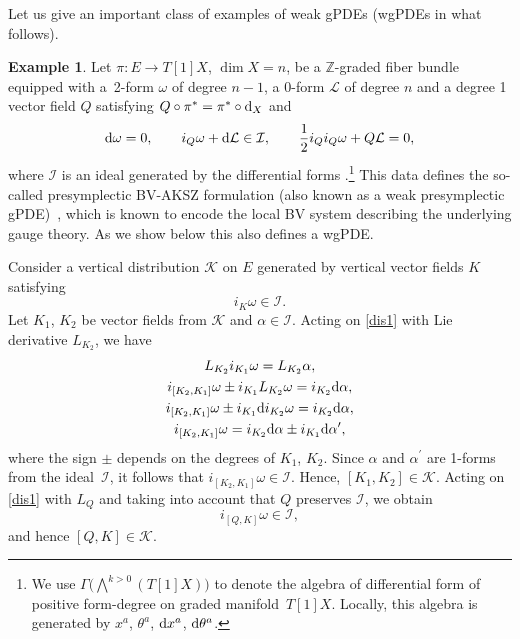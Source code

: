 \documentclass[pdftex]{sigma}
\numberwithin{equation}{section}
\theoremstyle{definition}
\newtheorem{Example}[Theorem]{Example}
\newcommand{\changed}[1]{{#1}}
\begin{document}
Let us give an important class of examples of weak gPDEs (wgPDEs in what follows).

\begin{Example} \label{ex:presymp}
 Let $\pi\colon E\rightarrow T[1]X$, $\dim{X}=n$, be a $\mathbb{Z}$-graded fiber bundle equipped with a~2-form $\omega$ of degree $n-1$, a 0-form $\mathcal{L}$ of degree $n$ and a degree 1 vector field $Q$ satisfying $Q\circ\pi^*=\pi^*\circ {\rm d}_X$ and
 \begin{equation*}%
 {\rm d}\omega=0,\qquad i_Q\omega+{\rm d}\mathcal{L}\in \mathcal{I},\qquad \frac{1}{2}i_Qi_Q\omega+Q\mathcal{L}=0,
 \end{equation*}
 where $\mathcal{I}$ is an ideal generated by the differential forms .\footnote{\changed{We use $\Gamma\bigl(\bigwedge^{k>0}(T[1]X)\bigr)$ to denote the algebra of differential form of positive form-degree on graded manifold~$T[1]X$. Locally, this algebra is generated by $x^a$, $\theta^a$, ${\rm d}x^a$, ${\rm d}\theta^a$.}} This data defines the so-called presymplectic BV-AKSZ formulation (also known as a weak presymplectic gPDE)~\cite{Dneprov:2024cvt, Grigoriev:2022zlq}, which is known to encode the local BV system describing the underlying gauge theory. As we show below this also defines a wgPDE.

 Consider a vertical distribution $\mathcal{K}$ on $E$ generated by vertical vector fields $K$ satisfying
 \begin{equation}\label{dis1}
 i_K\omega\in\mathcal{I}.
 \end{equation}
 Let $K_1$, $K_2$ be vector fields from $\mathcal{K}$ and $\alpha\in\mathcal{I}$. Acting on \eqref{dis1} with Lie derivative $L_{K_2}$, we have
 \begin{gather*}
 L_{K_2}i_{K_1}\omega=L_{K_2}\alpha,\\
 i_{[K_2,K_1]}\omega\pm i_{K_1}L_{K_2}\omega=i_{K_2}{\rm d}\alpha,\\
 i_{[K_2,K_1]}\omega\pm i_{K_1}{\rm d}i_{K_2}\omega=i_{K_2}{\rm d}\alpha,\\
 i_{[K_2,K_1]}\omega=i_{K_2}{\rm d}\alpha\pm i_{K_1}{\rm d}\alpha^{\prime},
 \end{gather*}
 where the sign $\pm$ depends on the degrees of $K_1$, $K_2$. Since $\alpha$ and $\alpha^{\prime}$ are 1-forms from the ideal~$\mathcal{I}$, it follows that $i_{[K_2,K_1]}\omega\in \mathcal{I}$. Hence, $[K_1,K_2]\in \mathcal{K}$. Acting on \eqref{dis1} with $L_Q$ and taking into account that $Q$ preserves $\mathcal{I}$, we obtain
 \begin{equation*}
 i_{[Q,K]}\omega\in\mathcal{I},
 \end{equation*}
 and hence $[Q,K]\in \mathcal{K}$.


\end{Example}
\end{document}
